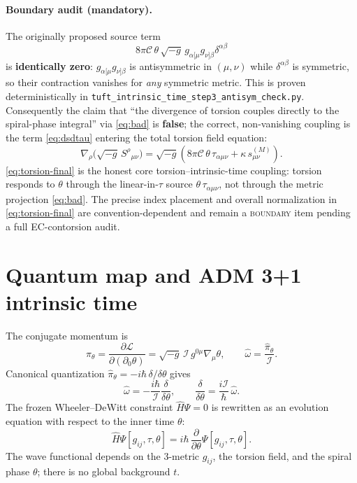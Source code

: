 \documentclass[11pt]{article}
\newcommand{\beq}{\begin{equation}}
\newcommand{\eeq}{\end{equation}}
\newcommand{\I}{\mathcal{I}}
\newcommand{\C}{\mathcal{C}}
\begin{document}
\paragraph{Boundary audit (mandatory).}
The originally proposed source term
\beq
8\pi\C\,\theta\,\sqrt{-g}\,g_{\alpha[\mu}g_{\nu]\beta}\delta^{\alpha\beta}
\tag{3.3}\label{eq:bad}
\eeq
is \textbf{identically zero}: $g_{\alpha[\mu}g_{\nu]\beta}$ is antisymmetric in
$(\mu,\nu)$ while $\delta^{\alpha\beta}$ is symmetric, so their contraction vanishes for
\emph{any} symmetric metric. This is proven deterministically in
\texttt{tuft\_intrinsic\_time\_step3\_antisym\_check.py}. Consequently the claim that
``the divergence of torsion couples directly to the spiral-phase integral'' via \eqref{eq:bad}
is \textbf{false}; the correct, non-vanishing coupling is the term \eqref{eq:dsdtau} entering
the total torsion field equation:
\beq
\nabla_\rho\!\big(\sqrt{-g}\,S^{\rho}{}_{\mu\nu}\big)
= \sqrt{-g}\left(
  8\pi\C\,\theta\,\tau_{\alpha\mu\nu} + \kappa\,s_{\mu\nu}^{(M)}
\right) .
\tag{3.4}\label{eq:torsion-final}
\eeq
\eqref{eq:torsion-final} is the honest core torsion--intrinsic-time coupling: torsion responds
to $\theta$ through the linear-in-$\tau$ source $\theta\,\tau_{\alpha\mu\nu}$, not through the
metric projection \eqref{eq:bad}. The precise index placement and overall normalization in
\eqref{eq:torsion-final} are convention-dependent and remain a \textsc{boundary} item pending
a full EC-contorsion audit.

\section{Quantum map and ADM 3+1 intrinsic time}
\label{sec:quantum}
The conjugate momentum is
\beq
\pi_\theta = \frac{\partial\mathcal{L}}{\partial(\partial_0\theta)}
= \sqrt{-g}\,\I\,g^{0\mu}\nabla_\mu\theta ,
\qquad \hat\omega = \frac{\hat\pi_\theta}{\I} .
\eeq
Canonical quantization $\hat\pi_\theta=-i\hbar\,\delta/\delta\theta$ gives
\beq
\hat\omega = -\frac{i\hbar}{\I}\frac{\delta}{\delta\theta} ,
\qquad
\frac{\delta}{\delta\theta} = \frac{i\I}{\hbar}\,\hat\omega .
\eeq
The frozen Wheeler--DeWitt constraint $\hat H\Psi=0$ is rewritten as an evolution equation
with respect to the inner time $\theta$:
\beq
\hat H\Psi[g_{ij},\tau,\theta] = i\hbar\,\frac{\partial}{\partial\theta}\Psi[g_{ij},\tau,\theta] .
\eeq
The wave functional depends on the 3-metric $g_{ij}$, the torsion field, and the spiral phase
$\theta$; there is no global background $t$.
\end{document}
